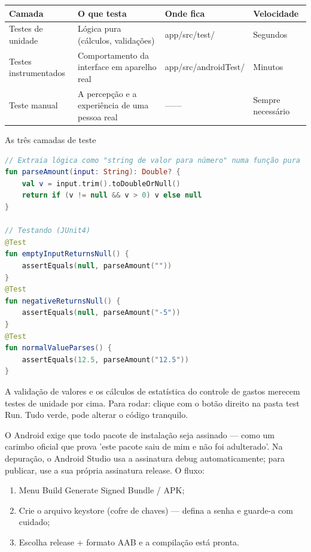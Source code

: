 \begin{center}
\begin{tabularx}{\linewidth}{|X|X|X|X|}
\hline
\textbf{Camada} & \textbf{O que testa} & \textbf{Onde fica} & \textbf{Velocidade} \tabularnewline
\hline
Testes de unidade & Lógica pura (cálculos, validações) & app/src/test/ & Segundos \tabularnewline
Testes instrumentados & Comportamento da interface em aparelho real & app/src/androidTest/ & Minutos \tabularnewline
Teste manual & A percepção e a experiência de uma pessoa real & —— & Sempre necessário \tabularnewline
\hline
\end{tabularx}
\end{center}

\begin{center}\small\color{gray}As três camadas de teste\end{center}

\begin{lstlisting}[language=Kotlin]
// Extraia lógica como "string de valor para número" numa função pura
fun parseAmount(input: String): Double? {
    val v = input.trim().toDoubleOrNull()
    return if (v != null && v > 0) v else null
}

// Testando (JUnit4)
@Test
fun emptyInputReturnsNull() {
    assertEquals(null, parseAmount(""))
}
@Test
fun negativeReturnsNull() {
    assertEquals(null, parseAmount("-5"))
}
@Test
fun normalValueParses() {
    assertEquals(12.5, parseAmount("12.5"))
}
\end{lstlisting}

A validação de valores e os cálculos de estatística do controle de gastos merecem testes de unidade por cima. Para rodar: clique com o botão direito na pasta test Run. Tudo verde, pode alterar o código tranquilo.


O Android exige que todo pacote de instalação seja assinado — como um carimbo oficial que prova 'este pacote saiu de mim e não foi adulterado'. Na depuração, o Android Studio usa a assinatura debug automaticamente; para publicar, use a sua própria assinatura release. O fluxo:

\begin{enumerate}
  \item Menu Build Generate Signed Bundle / APK;
  \item Crie o arquivo keystore (cofre de chaves) — defina a senha e guarde-a com cuidado;
  \item Escolha release + formato AAB e a compilação está pronta.
\end{enumerate}

